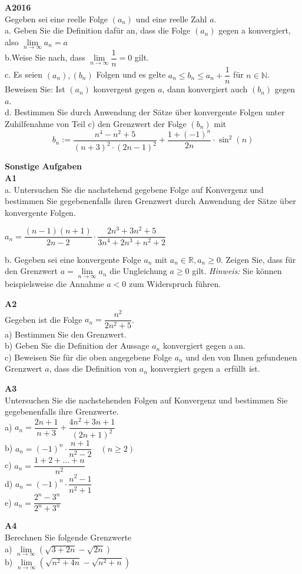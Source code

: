 \documentclass[landscape,twocolumn,a4paper]{article}
\begin{document}
\textbf{A2016} \\
Gegeben sei eine reelle Folge $(a_n)$ und eine reelle Zahl $a$. \\
a. Geben Sie die Definition dafür an, dass die Folge $(a_n)$ gegen a konvergiert, also $\lim \limits_{n \to \infty} a_n = a$ \\
b.Weise Sie nach, dass  $ \lim \limits_{n \to \infty} \dfrac{1}{n} = 0$ gilt. \\
c. Es seien $(a_n), (b_n)$ Folgen und es gelte $a_n \le b_n \le a_n + \dfrac{1}{n}$ für $n \in \mathbb{N}$.
Beweisen Sie: Ist $(a_n)$ konvergent gegen $a$, dann konvergiert auch $(b_n)$ gegen $a$. \\
d. Bestimmen Sie durch Anwendung der Sätze über konvergente Folgen unter Zuhilfenahme von Teil c) den Grenzwert der Folge $(b_n)$ mit 
$$b_n := \dfrac{n^4-n^2+5}{(n+3)^2 \cdot (2n-1)^2} + \dfrac{1+(-1)^n}{2n} \cdot  \sin^2(n)$$
\bigskip

\newpage

\textbf{Sonstige Aufgaben} \\

\textbf{A1} \\
a. Untersuchen Sie die nachstehend gegebene Folge auf Konvergenz und bestimmen Sie gegebenenfalls
ihren Grenzwert durch Anwendung der Sätze über konvergente Folgen. 

$a_n = \dfrac{(n-1)(n+1)}{2n-2} \cdot \dfrac{2n^3+3n^2+5}{3n^4+2n^3+n^2+2}$ 

b. Gegeben sei eine konvergente Folge $a_n$ mit $a_n \in \mathbb{R}, a_n \ge 0$. Zeigen Sie, dass
für den Grenzwert $a = \lim \limits_{n \to \infty} a_n$ die Ungleichung $a \ge 0$ gilt. \textit{Hinweis:} Sie
können beispielsweise die Annahme $a < 0$ zum Widerspruch führen.
\bigskip

\textbf{A2} \\
Gegeben ist die Folge $a_n = \dfrac{n^2}{2n^2+5}$. \\
a) Bestimmen Sie den Grenzwert. \\
b) Geben Sie die Definition der Aussage \glqq $a_n$ konvergiert gegen a\grqq\,an. \\
c) Beweisen Sie für die oben angegebene Folge $a_n$ und den von Ihnen gefundenen Grenzwert $a$, dass die
Definition von \glqq $a_n$ konvergiert gegen a\grqq\ erfüllt ist.\\
\bigskip

\textbf{A3} \\
Untersuchen Sie die nachstehenden Folgen auf Konvergenz und bestimmen Sie gegebenenfalls ihre Grenzwerte. \\
a) $a_n = \dfrac{2n+1}{n+3} + \dfrac{4n^2+3n+1}{(2n+1)^2} $\\
b) $a_n = (-1)^n \cdot \dfrac{n+1}{n^2-2} \quad (n \ge 2)$ \\
c) $a_n = \dfrac{1+2+...+n}{n^2} $ \\
d) $a_n = (-1)^n \cdot \dfrac{n^2-1}{n^2+1}$ \\
e) $a_n = \dfrac{2^n-3^n}{2^n+3^n}$

\textbf{A4} \\
Berechnen Sie folgende Grenzwerte \\
a) $\lim \limits_{n \to \infty} (\sqrt{3+2n}-\sqrt{2n})$ \\
b) $\lim \limits_{n \to \infty} (\sqrt{n^2+4n}-\sqrt{n^2+n})$ \\
\end{document}
